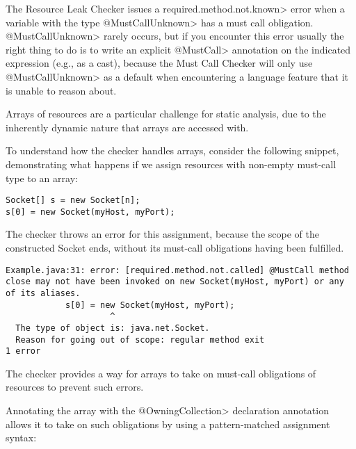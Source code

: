 The Resource Leak Checker issues a \<required.method.not.known> error
when a variable with the type \<@MustCallUnknown> has a must call obligation.
\<@MustCallUnknown> rarely occurs, but if you encounter this error usually
the right thing to do is to write an explicit \<@MustCall> annotation
on the indicated expression (e.g., as a cast), because the Must Call Checker
will only use \<@MustCallUnknown> as a default when encountering a language
feature that it is unable to reason about.

Arrays of resources are a particular challenge for static analysis, due to the inherently dynamic nature that arrays are accessed with.

To understand how the checker handles arrays, consider the following snippet, demonstrating what happens if we assign resources with non-empty must-call type to an array:

\begin{verbatim}
Socket[] s = new Socket[n];
s[0] = new Socket(myHost, myPort);
\end{verbatim}

The checker throws an error for this assignment, because the scope of the constructed Socket ends, without its must-call obligations having been fulfilled.

\begin{verbatim}
Example.java:31: error: [required.method.not.called] @MustCall method close may not have been invoked on new Socket(myHost, myPort) or any of its aliases.
            s[0] = new Socket(myHost, myPort);
                     ^
  The type of object is: java.net.Socket.
  Reason for going out of scope: regular method exit
1 error
\end{verbatim}

The checker provides a way for arrays to take on  must-call obligations of resources to prevent such errors.

Annotating the array with the \<@OwningCollection> declaration annotation allows it to take on such obligations by using a pattern-matched assignment syntax:

